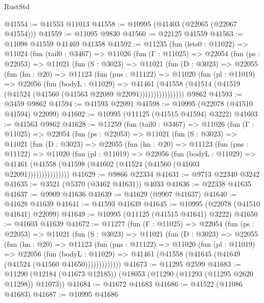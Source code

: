 \begin{lexlean}{RustStd}
\begin{coremodule}
@41554 := @41553 @11013
@41558 := @10995 (@41403 (@22065 (@22067 @41554)))
@41559 := @11095 @9830
@41560 := @22125 @41559
@41563 := @11098 @41559 @41469 @41358
@41592 := @11235
    (fun (lets0 : @11022) =>
    @11024
      (fun (tail0 : @3467) =>
      @11026
        (fun (Γ : @11025) =>
        @22054
          (fun (ps : @22053) =>
          @11021
            (fun (S : @3023) =>
            @11021
              (fun (D : @3023) =>
              @22055
                (fun (hn : @20) =>
                @11123
                  (fun (pns : @11122) =>
                  @11020
                    (fun (pl : @11019) =>
                    @22056
                      (fun (bodyL : @11029) =>
                      @41461
                        (@41558
                          (@41514 (@41519 (@41524 (@41560 (@41563 @22089 @22091))))))))))))))))
    @9862
@41593 := @3459 @9862
@41594 := @41593 @22091
@41598 := @10995 (@22078 (@41510 @41594) @22099)
@41602 := @10995 (@11125 (@41515 @41594) @3222)
@41603 := @41563 @9862
@41628 := @11259
    (fun (tail0 : @3467) =>
    @11026
      (fun (Γ : @11025) =>
      @22054
        (fun (ps : @22053) =>
        @11021
          (fun (S : @3023) =>
          @11021
            (fun (D : @3023) =>
            @22055
              (fun (hn : @20) =>
              @11123
                (fun (pns : @11122) =>
                @11020
                  (fun (pl : @11019) =>
                  @22056
                    (fun (bodyL : @11029) =>
                    @41461 (@41558 (@41598 (@41602 (@41524 (@41560 (@41603 @22091)))))))))))))))
@41629 := @9866 @22334
@41631 := @9713 @22340 @3242
@41635 := @3521 (@5370 (@3462 @41631)) @4033
@41636 := @22338 @41635
@41637 := @9909 @41636
@41639 := @41629 (@9907 @41637)
@41640 := @41628 @41639
@41641 := @41593 @41639
@41645 := @10995 (@22078 (@41510 @41641) @22099)
@41649 := @10995 (@11125 (@41515 @41641) @3222)
@41650 := @41603 @41639
@41672 := @11277
    (fun (Γ : @11025) =>
    @22054
      (fun (ps : @22053) =>
      @11021
        (fun (S : @3023) =>
        @11021
          (fun (D : @3023) =>
          @22055
            (fun (hn : @20) =>
            @11123
              (fun (pns : @11122) =>
              @11020
                (fun (pl : @11019) =>
                @22056
                  (fun (bodyL : @11029) =>
                  @41461 (@41558 (@41645 (@41649 (@41524 (@41560 @41650)))))))))))))
@41673 := @11295 @2599
@41683 := @11290 (@12184 (@41673 @12185)) (@18053 (@11290 (@11293 (@11295 @2620 @11298)) @11073))
@41684 := @41672 @41683
@41686 := @41522 (@11086 @41683)
@41687 := @10995 @41686

\end{coremodule}
\end{lexlean}
